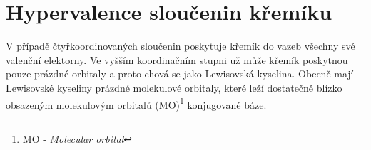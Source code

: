 \documentclass[
  digital, %
  table,   %
  lof,     %
  lot,     %
  oneside,
]{fithesis3}
\begin{document}
\section{Hypervalence sloučenin křemíku}\label{teorie_hypervalence}
V případě čtyřkoordinovaných sloučenin poskytuje křemík do vazeb všechny své valenční elektorny. Ve vyšším koordinačním stupni už může křemík poskytnou pouze prázdné orbitaly a proto chová se jako Lewisovská kyselina. Obecně mají Lewisovské kyseliny prázdné molekulové orbitaly, které leží dostatečně blízko obsazeným molekulovým orbitalů (MO)\footnote{MO - \textit{Molecular orbital}} konjugované báze.
\begin{figure}
\begin{center}

\end{center}
\end{figure}
\end{document}
